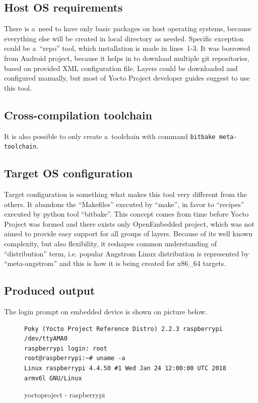 \documentclass[printmode]{mgr}
\begin{document}
\subsection*{Host OS requirements}

There is a~need to have only basic packages on host operating systems, because everything else will be created in local directory as needed.
Specific exception could be a~``repo'' tool, which installation is made in lines~1-3.
It was borrowed from Android project, because it helps in to download multiple git repositories, based on provided XML configuration file.
Layers could be downloaded and configured manually, but most of Yocto Project developer guides suggest to use this tool.

\subsection*{Cross-compilation toolchain}
It is also possible to only create a~toolchain with command \verb|bitbake meta-toolchain|.

\subsection*{Target OS configuration}
Target configuration is something what makes this tool very different from the others.
It abandons the ``Makefiles'' executed by ``make'', in favor to ``recipes'' executed by python tool ``bitbake''.
This concept comes from time before Yocto Project was formed and there exists only OpenEmbedded project, which was not aimed to provide easy support for all groups of layers.
Because of its well known complexity, but also flexibility, it reshapes common understanding of ``distribution'' term, i.e. popular Angstrom Linux distribution is represented by ``meta-angstrom'' and this is how it is being created for x86\_64 targets.

\subsection*{Produced output}
The login prompt on embedded device is shown on picture below.


\begin{figure}
    \centering
\begin{verbatim}
Poky (Yocto Project Reference Distro) 2.2.3 raspberrypi /dev/ttyAMA0
raspberrypi login: root
root@raspberrypi:~# uname -a
Linux raspberrypi 4.4.50 #1 Wed Jan 24 12:00:00 UTC 2018 armv6l GNU/Linux
\end{verbatim}
    \caption{yoctoproject - raspberrypi}
\end{figure}
\end{document}

